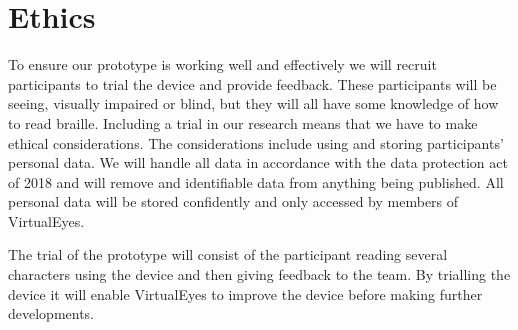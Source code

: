 \section{Ethics}
To ensure our prototype is working well and effectively we will recruit participants to trial the device and provide feedback. These participants will be seeing, visually impaired or blind, but they will all have some knowledge of how to read braille. Including a trial in our research means that we have to make ethical considerations. The considerations include using and storing participants' personal data. We will handle all data in accordance with the data protection act of 2018 and will remove and identifiable data from anything being published. All personal data will be stored confidently and only accessed by members of VirtualEyes. 

The trial of the prototype will consist of the participant reading several characters using the device and then giving feedback to the team. By trialling the device it will enable VirtualEyes to improve the device before making further developments. 
